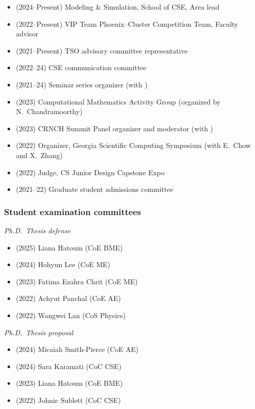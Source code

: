 \begin{itemize}
    \item (2024--Present) Modeling \& Simulation, School of CSE, Area lead
    \item (2022--Present) VIP Team Phoenix--Cluster Competition Team, Faculty advisor
    \item (2021--Present) TSO advisory committee representative
    \item (2022--24) CSE communication committee
    \item (2021--24) Seminar series organizer (with \Florian)
    \item (2023) Computational Mathematics Activity Group (organized by N.\ Chandramoorthy)
    \item (2023) CRNCH Summit Panel organizer and moderator (with \Rich)
    \item (2022) Organizer, Georgia Scientific Computing Symposium (with E.\ Chow and X.\ Zhang)
    \item (2022) Judge, CS Junior Design Capstone Expo
    \item (2021--22) Graduate student admissions committee
\end{itemize}

\subsubsection{Student examination committees}

\textit{Ph.D.\ Thesis defense}
\vspace{-0.25cm}
\begin{multicols}{2}
\begin{itemize}
    \item (2025)  Liana Hatoum (CoE BME)
    \item (2024)  Hohyun Lee (CoE ME)
    \item (2023)  Fatima Ezahra Chrit (CoE ME)
    \item (2022)  Achyut Panchal (CoE AE)
    \item (2022)  Wangwei Lan (CoS Physics)
\end{itemize}
\end{multicols}

\textit{Ph.D.\ Thesis proposal}
\vspace{-0.25cm}
\begin{multicols}{2}
\begin{itemize}
    \item (2024)  Micaiah Smith-Pierce (CoE AE)
    \item (2024)  Sara Karamati (CoC CSE)
    \item (2023)  Liana Hatoum (CoE BME)
    \item (2022)  Johnie Sublett (CoC CSE)
\end{itemize}
\end{multicols}


